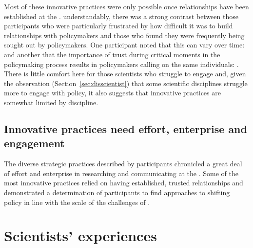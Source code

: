 Most of these innovative practices were only possible once relationships have been established at the \SPI{}. understandably, there was a strong contrast between those participants who were particularly frustrated by how difficult it was to build relationships with policymakers and those who found they were frequently being sought out by policymakers. One participant noted that this can vary over time:  and another that the importance of trust during critical moments in the policymaking process results in policymakers calling on the same individuals: . There is little comfort here for those scientists who struggle to engage and, given the observation (Section~\ref{sec:disscientist}) that some scientific disciplines struggle more to engage with policy, it also suggests that innovative practices are somewhat limited by discipline.

\subsection{Innovative practices need effort, enterprise and engagement}

The diverse strategic practices described by participants chronicled a great deal of effort and enterprise in researching and communicating at the \SPI. Some of the most innovative practices relied on having established, trusted relationships and demonstrated a determination of participants to find approaches to shifting policy in line with the scale of the challenges of \CAN.  

\section{Scientists' experiences}\label{sec:disexperience}

